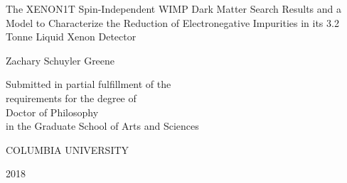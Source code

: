
\thispagestyle{empty} %
\begin{center}
  \SingleSpace

  \vspace*{1in}

  The XENON1T Spin-Independent WIMP Dark Matter Search Results and a Model to Characterize the Reduction of Electronegative Impurities in
  its 3.2 Tonne Liquid Xenon Detector

  \bigskip %

  Zachary Schuyler Greene

  \vspace{5in}

  Submitted in partial fulfillment of the\\
  requirements for the degree of\\
  Doctor of Philosophy\\
  in the Graduate School of Arts and Sciences

  \bigskip
  \bigskip

  COLUMBIA UNIVERSITY

  \bigskip %

  2018
\end{center}
